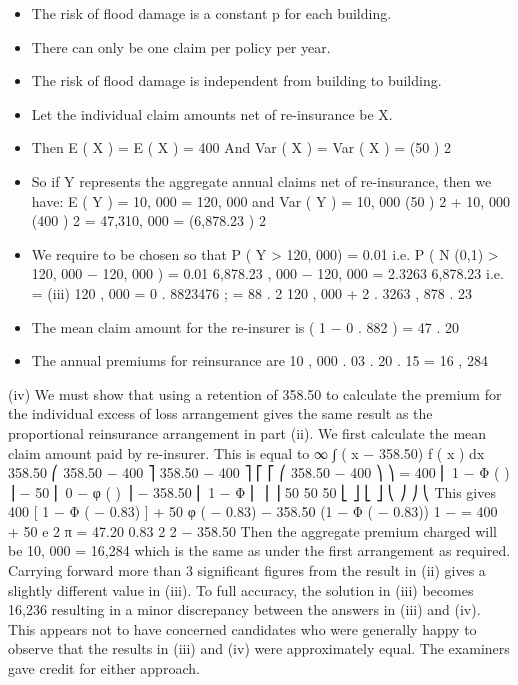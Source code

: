 \documentclass[a4paper,12pt]{article}
\begin{document}
\begin{itemize}
\item The risk of flood damage is a constant p for each building.
\item There can only be one claim per policy per year.
\item The risk of flood damage is independent from building to building.
\item Let the individual claim amounts net of re-insurance be X. 
\item Then
E ( \alpha X ) = \alpha E ( X ) = 400 \alpha
And Var ( \alpha X ) =  Var ( X ) = (50 \alpha ) 2
\item So if Y represents the aggregate annual claims net of re-insurance, then we
have:
E ( Y ) = 10, 000   \alpha = 120, 000 \alpha
and
Var ( Y ) = 10, 000  \times (50 \alpha ) 2 + 10, 000   \times (400 \alpha ) 2 = 47,310, 000 
= (6,878.23 \alpha ) 2
\item We require \alpha to be chosen so that
P ( Y > 120, 000) = 0.01
i.e. P ( N (0,1) >
120, 000 − 120, 000 \alpha
) = 0.01
6,878.23 , 000 − 120, 000 \alpha
= 2.3263
6,878.23 \alpha
i.e. \alpha =
(iii)
120 , 000
= 0 . 8823476 ; \alpha = 88 . 2 %
120 , 000 + 2 . 3263  , 878 . 23
\item The mean claim amount for the re-insurer is ( 1 − 0 . 882 )  = 47 . 20
\item The annual premiums for reinsurance are 10 , 000  . 03  . 20  . 15 = 16 , 284
\end{itemize}
(iv)
We must show that using a retention of 358.50 to calculate the premium for the individual excess of loss arrangement gives the same result as the proportional reinsurance arrangement in part (ii).
We first calculate the mean claim amount paid by re-insurer. This is equal to
∞
∫
( x − 358.50) f ( x ) dx
358.50
⎛
358.50 − 400 ⎤
358.50 − 400 ⎤
⎡
⎡
⎛ 358.50 − 400 ⎞ ⎞
= 400 ⎢ 1 − Φ (
) ⎥ − 50 ⎢ 0 − φ (
) ⎥ − 358.50 \times ⎜ 1 − Φ ⎜
⎟ ⎟
50
50
50
⎣
⎦
⎣
⎦
⎝
⎠ ⎠
⎝
This gives
400 [ 1 − Φ ( − 0.83) ] + 50 φ ( − 0.83) − 358.50 \times (1 − Φ ( − 0.83))
1 −
= 400  + 50 \times
e
2 π
= 47.20
0.83 2
2
− 358.50 
Then the aggregate premium charged will be 10, 000    =
16,284 which is the same as under the first arrangement as required.
Carrying forward more than 3 significant figures from the result in (ii) gives a slightly
different value in (iii). To full accuracy, the solution in (iii) becomes 16,236 resulting in a
minor discrepancy between the answers in (iii) and (iv). This appears not to have concerned
candidates who were generally happy to observe that the results in (iii) and (iv) were
approximately equal. The examiners gave credit for either approach.

\end{document}
